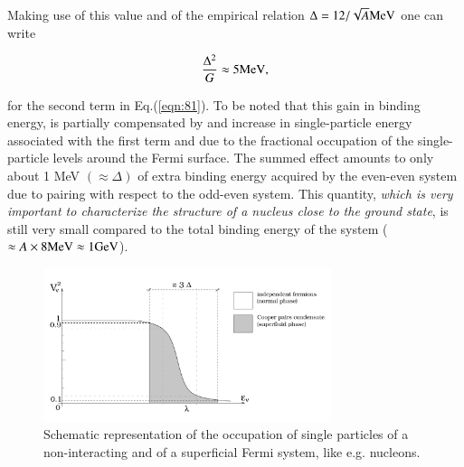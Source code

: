 \documentclass[a4paper,14pt]{book}
\begin{document}
\noindent Making use of this value and of the empirical relation $\Delta = 12/\sqrt{A} {\rm MeV}$ one can write

\begin{equation}
\nonumber
\frac{\Delta^2}{G} \approx 5 {\rm MeV},
\end{equation}

\noindent for the second term in Eq.(\ref{eqn:81}). To be noted that this gain in binding energy, is partially compensated by and increase in single-particle energy associated with the first term and due to the fractional occupation of the single-particle levels around the Fermi surface. The summed effect amounts to only about 1 MeV $(\approx \Delta)$ of extra binding energy acquired by the even-even system due to pairing with respect to the odd-even system. This quantity, {\it which is very important to characterize the structure of a nucleus close to the ground state}, is still very small compared to the total binding energy of the system ($\approx A \times 8 {\rm MeV} \approx 1 {\rm GeV}$).

\begin{figure}[h!]
\centerline{
\includegraphics*[width=0.75\textwidth]{figs_C7S/fig_8_2}
}
\caption{Schematic representation of the occupation of single particles of a non-interacting and of a superficial Fermi system, like e.g. nucleons.}
\label{fig:8.2}
\end{figure}
\end{document}
